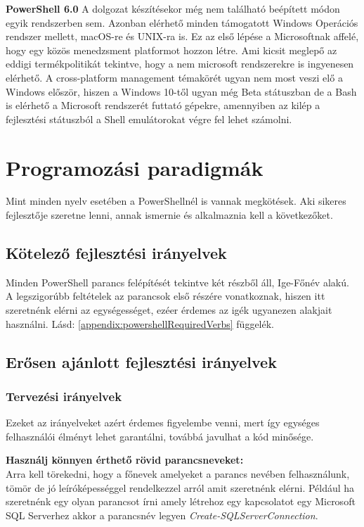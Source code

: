 \documentclass[12pt,oneside,justify,table]{book}
\begin{document}
\noindent\textbf{PowerShell 6.0}
\newline A dolgozat készítésekor még nem található beépített módon egyik rendszerben sem. Azonban elérhető minden támogatott Windows Operációs rendszer mellett, macOS-re és UNIX-ra is. Ez az első lépése a Microsoftnak affelé, hogy egy közös menedzsment platformot hozzon létre. Ami kicsit meglepő az eddigi termékpolitikát tekintve, hogy a nem microsoft rendszerekre is ingyenesen elérhető.
A cross-platform management témakörét ugyan nem most veszi elő a Windows először, hiszen a Windows 10-től ugyan még Beta státuszban de a Bash is elérhető a Microsoft rendszerét futtató gépekre, amennyiben az kilép a fejlesztési státuszból a Shell emulátorokat végre fel lehet számolni.

\section{Programozási paradigmák}
Mint minden nyelv esetében a PowerShellnél is vannak megkötések. Aki sikeres fejlesztője szeretne lenni, annak ismernie és alkalmaznia kell a következőket.
\subsection{Kötelező fejlesztési irányelvek}
Minden PowerShell parancs felépítését tekintve két részből áll, Ige-Főnév alakú. A legszigorúbb feltételek az parancsok első részére vonatkoznak, hiszen itt szeretnénk elérni az egységességet, ezéer érdemes az igék ugyanezen alakjait használni. 
Lásd: \ref{appendix:powershellRequiredVerbs} függelék.
\subsection{Erősen ajánlott fejlesztési irányelvek}
\subsubsection{Tervezési irányelvek}
Ezeket az irányelveket azért érdemes figyelembe venni, mert így egységes felhasználói élményt lehet garantálni, továbbá javulhat a kód minősége.

\noindent \textbf{Használj könnyen érthető rövid parancsneveket:}\\
Arra kell törekedni, hogy a főnevek amelyeket a parancs nevében felhasználunk, tömör de jó leíróképességgel rendelkezzel arról amit szeretnénk elérni. Például ha szeretnénk egy olyan parancsot írni amely létrehoz egy kapcsolatot egy Microsoft SQL Serverhez akkor a parancsnév legyen \textit{Create-SQLServerConnection}. \\
\end{document}
